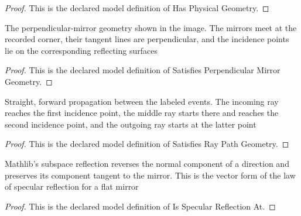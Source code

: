 \begin{proof}
  This is the declared model definition of Has Physical Geometry.
\end{proof}
\begin{definition}
  \label{def:physics:phyx-mini-0142:phyxminiproblems-problemphyxmini0142-satisfiesperpendicularmirrorgeometry}
  The perpendicular-mirror geometry shown in the image. The mirrors meet at the recorded corner, their tangent lines are perpendicular, and the incidence points lie on the corresponding reflecting surfaces
\end{definition}
\begin{proof}
  This is the declared model definition of Satisfies Perpendicular Mirror Geometry.
\end{proof}
\begin{definition}
  \label{def:physics:phyx-mini-0142:phyxminiproblems-problemphyxmini0142-satisfiesraypathgeometry}
  Straight, forward propagation between the labeled events. The incoming ray reaches the first incidence point, the middle ray starts there and reaches the second incidence point, and the outgoing ray starts at the latter point
\end{definition}
\begin{proof}
  This is the declared model definition of Satisfies Ray Path Geometry.
\end{proof}
\begin{definition}
  \label{def:physics:phyx-mini-0142:phyxminiproblems-problemphyxmini0142-isspecularreflectionat}
  Mathlib's subspace reflection reverses the normal component of a direction and preserves its component tangent to the mirror. This is the vector form of the law of specular reflection for a flat mirror
\end{definition}
\begin{proof}
  This is the declared model definition of Is Specular Reflection At.
\end{proof}
